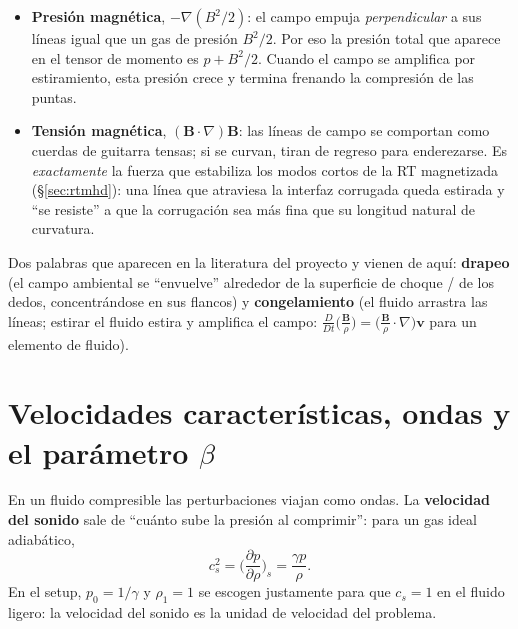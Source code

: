 \documentclass[11pt,a4paper]{article}
\newcommand{\B}{\mathbf{B}}
\newcommand{\vct}{\mathbf{v}}
\newcommand{\term}[1]{\textbf{#1}}
\begin{document}
\begin{itemize}
  \item \textbf{Presión magnética}, $-\nabla(B^2/2)$: el campo empuja \emph{perpendicular}
  a sus líneas igual que un gas de presión $B^2/2$. Por eso la presión total que aparece en
  el tensor de momento es $p+B^2/2$. Cuando el campo se amplifica por estiramiento, esta
  presión crece y termina frenando la compresión de las puntas.
  \item \textbf{Tensión magnética}, $(\B\cdot\nabla)\B$: las líneas de campo se comportan
  como cuerdas de guitarra tensas; si se curvan, tiran de regreso para enderezarse. Es
  \emph{exactamente} la fuerza que estabiliza los modos cortos de la RT magnetizada
  (\S\ref{sec:rtmhd}): una línea que atraviesa la interfaz corrugada queda estirada y
  ``se resiste'' a que la corrugación sea más fina que su longitud natural de curvatura.
\end{itemize}

Dos palabras que aparecen en la literatura del proyecto y vienen de aquí:
\term{drapeo} (el campo ambiental se ``envuelve'' alrededor de la superficie de choque /
de los dedos, concentrándose en sus flancos) y \term{congelamiento} (el fluido arrastra las
líneas; estirar el fluido estira y amplifica el campo: $\frac{D}{Dt}\Big(\frac{\B}{\rho}\Big)=\Big(\frac{\B}{\rho}\cdot\nabla\Big)\vct$ para un elemento de fluido).

\section{Velocidades características, ondas y el parámetro $\beta$}

En un fluido compresible las perturbaciones viajan como ondas. La \term{velocidad del
sonido} sale de ``cuánto sube la presión al comprimir'': para un gas ideal adiabático,
\begin{equation}
c_s^2=\Big(\frac{\partial p}{\partial\rho}\Big)_s=\frac{\gamma p}{\rho}.
\end{equation}
En el setup, $p_0=1/\gamma$ y $\rho_1=1$ se escogen justamente para que $c_s=1$ en el fluido
ligero: la velocidad del sonido es la unidad de velocidad del problema.
\end{document}
